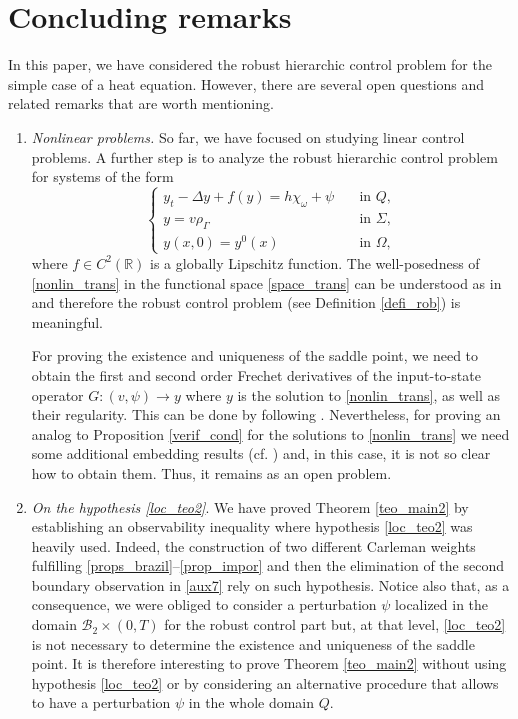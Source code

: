 \documentclass[preprint,10pt]{article}
\numberwithin{equation}{section}
\numberwithin{theorem}{section}
\def\csbd{\rho_{\Gamma}}
\begin{document}
{\section{Concluding remarks}\label{sec_conclusion}

In this paper, we have considered the robust hierarchic control problem for the simple case of a heat equation. However, there are several open questions and related remarks that are worth mentioning.

\begin{enumerate}
\item \textit{Nonlinear problems.} So far, we have focused on studying linear control problems. A further step is to analyze the robust hierarchic control problem for systems of the form
%
\begin{equation}\label{nonlin_trans}
\begin{cases}
y_t-\Delta y+f(y)=h\chi_{\omega}+\psi &\quad \text{in } Q,\\
y=v\csbd &\quad\text{in }\Sigma, \\
y(x,0)=y^0(x) &\quad\text{in } \Omega,
\end{cases}
\end{equation}
%
where $f\in C^2(\mathbb{R})$ is a globally Lipschitz function. The well-posedness of \eqref{nonlin_trans} in the  functional space \eqref{space_trans} can be understood as in \cite[Section 8.2]{pighin} and therefore the robust control problem (see Definition \ref{defi_rob}) is meaningful. 

For proving the existence and uniqueness of the saddle point, we need to obtain the first and second order Frechet derivatives of the input-to-state operator $G:(v,\psi)\to y$ where $y$ is the solution to \eqref{nonlin_trans}, {as well as their regularity.} This can be done by following \cite{vhs_deT_rob}. Nevertheless, for proving an analog to Proposition \ref{verif_cond} for the solutions to \eqref{nonlin_trans} we need some additional embedding results (cf. \cite[Proof of Prop. 2]{vhs_deT_rob}) and, in this case, it is not so clear how to obtain them. Thus, it remains as an open problem.
%
\item \textit{On the hypothesis \eqref{loc_teo2}}. We have proved Theorem \ref{teo_main2} by establishing an observability inequality where hypothesis \eqref{loc_teo2} was heavily used. Indeed, the construction of two different Carleman weights fulfilling \eqref{props_brazil}--\eqref{prop_impor} and then the elimination of the second boundary observation in \eqref{aux7} rely on such hypothesis. Notice also that, as a consequence, we were obliged to consider a perturbation $\psi$ localized in the domain $\mathcal B_2\times(0,T)$ for the robust control part but, at that level, \eqref{loc_teo2} is not necessary to determine the existence and uniqueness of the saddle point. It is therefore interesting to prove Theorem \ref{teo_main2} without using hypothesis \eqref{loc_teo2} or by considering an alternative procedure that allows to have a perturbation $\psi$ in the whole domain $Q$. 


\end{enumerate}}
\end{document}
